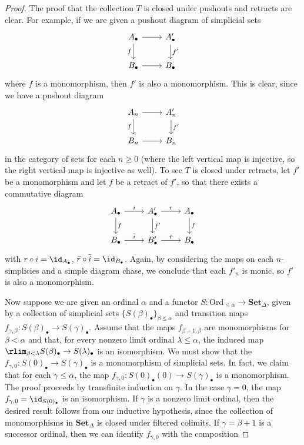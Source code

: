 \begin{proof}
The proof that the collection $T$ is closed under pushouts and retracts are clear. For example, if we are given a pushout diagram of simplicial sets 
\[\begin{tikzcd}
A_\bullet\ar[r]\ar[d,swap,"f"]&A'_\bullet\ar[d,"f'"]\\
B_\bullet\ar[r]&B_\bullet
\end{tikzcd}\]
where $f$ is a monomorphism, then $f'$ is also a monomorphism. This is clear, since we have a pushout diagram
\[\begin{tikzcd}
A_n\ar[r]\ar[d,swap,"f"]&A'_n\ar[d,"f'"]\\
B_n\ar[r]&B_n
\end{tikzcd}\]
in the category of sets for each $n\geq 0$ (where the left vertical map is injective, so the right vertical map is injective as well). To see $T$ is closed under retracts, let $f'$ be a monomorphism and let $f$ be a retract of $f'$, so that there exists a commutative diagram
\[\begin{tikzcd}
A_\bullet\ar[r,"i"]\ar[d,"f"]&A'_\bullet\ar[r,"r"]\ar[d,"f'"]&A_\bullet\ar[d,"f"]\\
B_\bullet\ar[r,"\bar{i}"]&B'_\bullet\ar[r,"\bar{r}"]&B_\bullet
\end{tikzcd}\]
with $r\circ i=\id_{A_\bullet}$, $\bar{r}\circ\bar{i}=\id_{B_\bullet}$. Again, by considering the maps on each $n$-simplicies and a simple diagram chase, we conclude that each $f'_n$ is monic, so $f'$ is also a monomorphism.\par
Now suppose we are given an ordinal $\alpha$ and a functor $S:\mathrm{Ord}_{\leq\alpha}\to\mathbf{Set}_\Delta$, given by a collection of simplicial sets $\{S(\beta)_\bullet\}_{\beta\leq\alpha}$ and transition maps $f_{\gamma,\beta}:S(\beta)_\bullet\to S(\gamma)_\bullet$. Assume that the maps $f_{\beta+1,\beta}$ are monomorphisms for $\beta<\alpha$ and that, for every nonzero limit ordinal $\lambda\leq\alpha$, the induced map $\rlim_{\beta<\lambda}S(\beta)_\bullet\to S(\lambda)_\bullet$ is an isomorphism. We must show that the $f_{\gamma,0}:S(0)_\bullet\to S(\gamma)_\bullet$ is a monomorphism of simplicial sets. In fact, we claim that for each $\gamma\leq\alpha$, the map $f_{\gamma,0}:S(0)_\bullet(0)\to S(\gamma)_\bullet$ is a monomorphism. The proof proceeds by transfinite induction on $\gamma$. In the case $\gamma=0$, the map $f_{\gamma,0}=\id_{S(0)_\bullet}$ is an isomorphism. If $\gamma$ is a nonzero limit ordinal, then the desired result follows from our inductive hypothesis, since the collection of monomorphisms in $\mathbf{Set}_\Delta$ is closed under filtered colimits. If $\gamma=\beta+1$ is a successor ordinal, then we can identify $f_{\gamma,0}$ with the composition

\end{proof}
